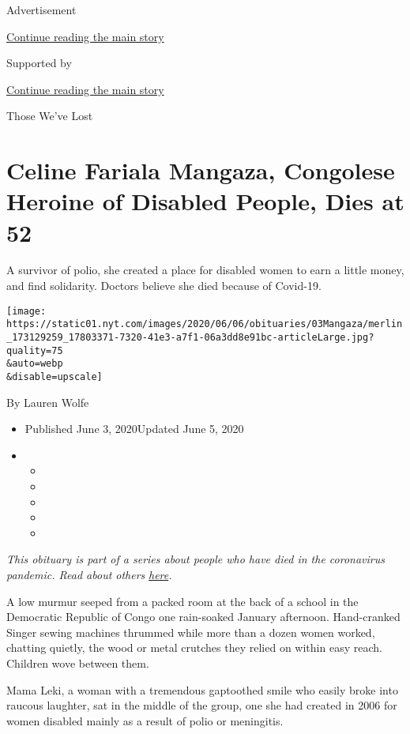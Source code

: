 Advertisement

\protect\hyperlink{after-top}{Continue reading the main story}

Supported by

\protect\hyperlink{after-sponsor}{Continue reading the main story}

Those We've Lost

\hypertarget{celine-fariala-mangaza-congolese-heroine-of-disabled-people-dies-at-52}{%
\section{Celine Fariala Mangaza, Congolese Heroine of Disabled People,
Dies at
52}\label{celine-fariala-mangaza-congolese-heroine-of-disabled-people-dies-at-52}}

A survivor of polio, she created a place for disabled women to earn a
little money, and find solidarity. Doctors believe she died because of
Covid-19.

\texttt{[image: https://static01.nyt.com/images/2020/06/06/obituaries/03Mangaza/merlin\_173129259\_17803371-7320-41e3-a7f1-06a3dd8e91bc-articleLarge.jpg?quality=75\\\&auto=webp\\\&disable=upscale]}

By Lauren Wolfe

\begin{itemize}
\item
  Published June 3, 2020Updated June 5, 2020
\item
  \begin{itemize}
  \item
  \item
  \item
  \item
  \item
  \end{itemize}
\end{itemize}

\emph{This obituary is part of a series about people who have died in
the coronavirus pandemic. Read about others}
\href{https://www.nytimes.com/interactive/2020/obituaries/people-died-coronavirus-obituaries.html}{\emph{here}}\emph{.}

A low murmur seeped from a packed room at the back of a school in the
Democratic Republic of Congo one rain-soaked January afternoon.
Hand-cranked Singer sewing machines thrummed while more than a dozen
women worked, chatting quietly, the wood or metal crutches they relied
on within easy reach. Children wove between them.

Mama Leki, a woman with a tremendous gaptoothed smile who easily broke
into raucous laughter, sat in the middle of the group, one she had
created in 2006 for women disabled mainly as a result of polio or
meningitis.

